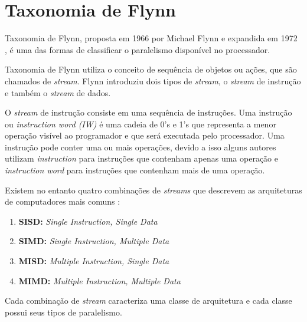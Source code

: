 \chapter{Taxonomia de Flynn}

Taxonomia de Flynn, proposta em 1966 \cite{Flynn:1966} por Michael 
Flynn e expandida em 1972 \cite{Flynn:1972}, é uma das formas de classificar o 
paralelismo disponível no processador.  

Taxonomia de Flynn utiliza o conceito de sequência de objetos ou ações, que são
chamados de \textit{stream}.
Flynn introduziu dois tipos de \textit{stream}, o 
\textit{stream} de instrução e também o \textit{stream} de dados. 

O \textit{stream} de instrução consiste em uma sequência de instruções. 
Uma instrução ou \textit{instruction word (IW)} é uma cadeia de 0's e 1's que 
representa a menor operação visível ao programador e que será executada pelo 
processador. 
Uma instrução pode conter uma ou mais operações, devido a isso
alguns autores utilizam \textit{instruction} para instruções que contenham 
apenas uma operação e \textit{instruction word} para instruções que contenham 
mais de uma operação.

\begin{comment}
Processadores escalares (\textit{scalar processors}) e processadores
superescalares (\textit{superscalar processors}) executam uma ou mais
\textit{instructions} por ciclo de \textit{clock} da máquina. 
\end{comment}

Existem no entanto quatro combinações de \textit{streams} que descrevem as 
arquiteturas de computadores mais comuns \cite{Flynn:1996}:

\begin{enumerate}
        \item \textbf{SISD:} \textit{Single Instruction, Single Data}
        \item \textbf{SIMD:} \textit{Single Instruction, Multiple Data}
        \item \textbf{MISD:} \textit{Multiple Instruction, Single Data}
        \item \textbf{MIMD:} \textit{Multiple Instruction, Multiple Data}
\end{enumerate}

Cada combinação de \textit{stream} caracteriza uma classe de arquitetura 
e cada classe possui seus tipos de paralelismo.


